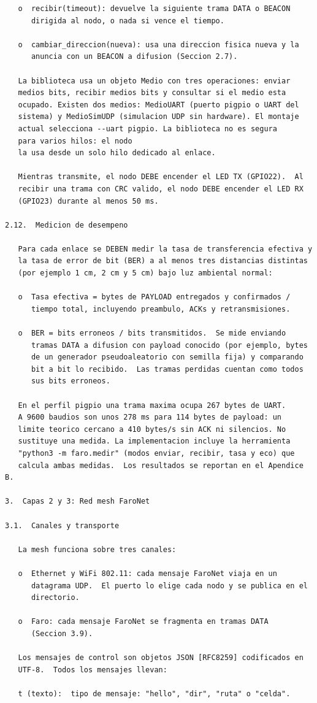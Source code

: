 \newpage
\begin{Verbatim}
   o  recibir(timeout): devuelve la siguiente trama DATA o BEACON
      dirigida al nodo, o nada si vence el tiempo.

   o  cambiar_direccion(nueva): usa una direccion fisica nueva y la
      anuncia con un BEACON a difusion (Seccion 2.7).

   La biblioteca usa un objeto Medio con tres operaciones: enviar
   medios bits, recibir medios bits y consultar si el medio esta
   ocupado. Existen dos medios: MedioUART (puerto pigpio o UART del
   sistema) y MedioSimUDP (simulacion UDP sin hardware). El montaje
   actual selecciona --uart pigpio. La biblioteca no es segura
   para varios hilos: el nodo
   la usa desde un solo hilo dedicado al enlace.

   Mientras transmite, el nodo DEBE encender el LED TX (GPIO22).  Al
   recibir una trama con CRC valido, el nodo DEBE encender el LED RX
   (GPIO23) durante al menos 50 ms.

2.12.  Medicion de desempeno

   Para cada enlace se DEBEN medir la tasa de transferencia efectiva y
   la tasa de error de bit (BER) a al menos tres distancias distintas
   (por ejemplo 1 cm, 2 cm y 5 cm) bajo luz ambiental normal:

   o  Tasa efectiva = bytes de PAYLOAD entregados y confirmados /
      tiempo total, incluyendo preambulo, ACKs y retransmisiones.

   o  BER = bits erroneos / bits transmitidos.  Se mide enviando
      tramas DATA a difusion con payload conocido (por ejemplo, bytes
      de un generador pseudoaleatorio con semilla fija) y comparando
      bit a bit lo recibido.  Las tramas perdidas cuentan como todos
      sus bits erroneos.

   En el perfil pigpio una trama maxima ocupa 267 bytes de UART.
   A 9600 baudios son unos 278 ms para 114 bytes de payload: un
   limite teorico cercano a 410 bytes/s sin ACK ni silencios. No
   sustituye una medida. La implementacion incluye la herramienta
   "python3 -m faro.medir" (modos enviar, recibir, tasa y eco) que
   calcula ambas medidas.  Los resultados se reportan en el Apendice B.

3.  Capas 2 y 3: Red mesh FaroNet

3.1.  Canales y transporte

   La mesh funciona sobre tres canales:

   o  Ethernet y WiFi 802.11: cada mensaje FaroNet viaja en un
      datagrama UDP.  El puerto lo elige cada nodo y se publica en el
      directorio.

   o  Faro: cada mensaje FaroNet se fragmenta en tramas DATA
      (Seccion 3.9).

   Los mensajes de control son objetos JSON [RFC8259] codificados en
   UTF-8.  Todos los mensajes llevan:

   t (texto):  tipo de mensaje: "hello", "dir", "ruta" o "celda".
\end{Verbatim}
